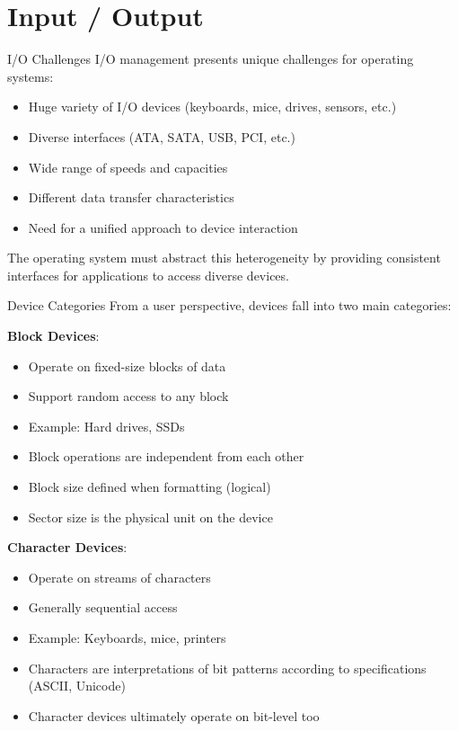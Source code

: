 \section{Input / Output}

\begin{concept}{I/O Challenges}
    I/O management presents unique challenges for operating systems:
    \begin{itemize}
        \item Huge variety of I/O devices (keyboards, mice, drives, sensors, etc.)
        \item Diverse interfaces (ATA, SATA, USB, PCI, etc.)
        \item Wide range of speeds and capacities
        \item Different data transfer characteristics
        \item Need for a unified approach to device interaction
    \end{itemize}
    
    The operating system must abstract this heterogeneity by providing consistent interfaces for applications to access diverse devices.
\end{concept}

\begin{definition}{Device Categories}
    From a user perspective, devices fall into two main categories:

    \begin{minipage}{0.5\linewidth}
        \textbf{Block Devices}:
            \begin{itemize}
                \item Operate on fixed-size blocks of data
                \item Support random access to any block
                \item Example: Hard drives, SSDs
                \item Block operations are independent from each other
                \item Block size defined when formatting (logical)
                \item Sector size is the physical unit on the device
            \end{itemize}
    \end{minipage}
    \begin{minipage}{0.5\linewidth}
        \textbf{Character Devices}:
            \begin{itemize}
                \item Operate on streams of characters
                \item Generally sequential access
                \item Example: Keyboards, mice, printers
                \item Characters are interpretations of bit patterns according to specifications (ASCII, Unicode)
                \item Character devices ultimately operate on bit-level too
            \end{itemize}
    \end{minipage}
\end{definition}


